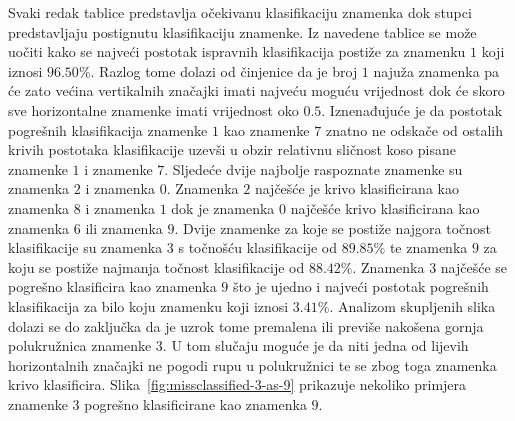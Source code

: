 Svaki redak tablice predstavlja očekivanu klasifikaciju znamenka dok stupci predstavljaju postignutu klasifikaciju
znamenke. Iz navedene tablice se može uočiti kako se najveći postotak ispravnih klasifikacija postiže za znamenku $1$
koji iznosi $96.50\%$. Razlog tome dolazi od činjenice da je broj $1$ najuža znamenka pa će zato većina vertikalnih
značajki imati najveću moguću vrijednost dok će skoro sve horizontalne znamenke imati vrijednost oko $0.5$. Iznenađujuće
je da postotak pogrešnih klasifikacija znamenke $1$ kao znamenke $7$ znatno ne odskače od ostalih krivih postotaka
klasifikacije uzevši u obzir relativnu sličnost koso pisane znamenke $1$ i znamenke $7$. Sljedeće dvije najbolje
raspoznate znamenke su znamenka $2$ i znamenka $0$. Znamenka $2$ najčešće je krivo klasificirana kao znamenka $8$ i
znamenka $1$ dok je znamenka $0$ najčešće krivo klasificirana kao znamenka $6$ ili znamenka $9$. Dvije znamenke za koje
se postiže najgora točnost klasifikacije su znamenka $3$ s točnošću klasifikacije od $89.85\%$ te znamenka $9$ za koju
se postiže najmanja točnost klasifikacije od $88.42\%$. Znamenka $3$ najčešće se pogrešno klasificira kao znamenka $9$
što je ujedno i najveći postotak pogrešnih klasifikacija za bilo koju znamenku koji iznosi $3.41\%$. Analizom
skupljenih slika dolazi se do zaključka da je uzrok tome premalena ili previše nakošena gornja polukružnica znamenke
$3$. U tom slučaju moguće je da niti jedna od lijevih horizontalnih značajki ne pogodi rupu u polukružnici te se zbog
toga znamenka krivo klasificira. Slika\ \ref{fig:missclassified-3-as-9} prikazuje nekoliko primjera znamenke $3$
pogrešno klasificirane kao znamenka $9$.
